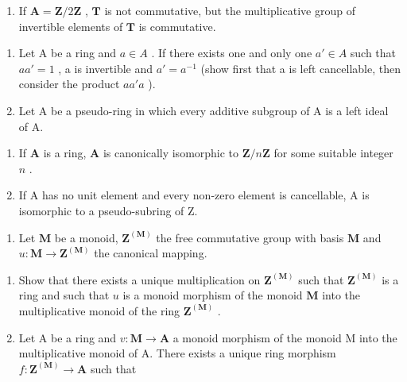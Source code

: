 \begin{enumerate}
\def\labelenumi{(\alph{enumi})}
\setcounter{enumi}{3}
\tightlist
\item
  If \(\mathbf{A} = \mathbf{Z} / 2\mathbf{Z}\) , \(\mathbf{T}\) is not commutative, but the multiplicative group of invertible elements of \(\mathbf{T}\) is commutative.
\end{enumerate}

\begin{enumerate}
\def\labelenumi{\arabic{enumi}.}
\setcounter{enumi}{2}
\item
  Let A be a ring and \(a \in A\) . If there exists one and only one \(a' \in A\) such that \(aa' = 1\) , a is invertible and \(a' = a^{-1}\) (show first that a is left cancellable, then consider the product \(aa'a\) ).
\item
  Let A be a pseudo-ring in which every additive subgroup of A is a left ideal of A.
\end{enumerate}

\begin{enumerate}
\def\labelenumi{(\alph{enumi})}
\item
  If \(\mathbf{A}\) is a ring, \(\mathbf{A}\) is canonically isomorphic to \(\mathbf{Z} / n\mathbf{Z}\) for some suitable integer \(n\) .
\item
  If A has no unit element and every non-zero element is cancellable, A is isomorphic to a pseudo-subring of Z.
\end{enumerate}

\begin{enumerate}
\def\labelenumi{\arabic{enumi}.}
\setcounter{enumi}{4}
\tightlist
\item
  Let \(\mathbf{M}\) be a monoid, \(\mathbf{Z}^{(\mathbf{M})}\) the free commutative group with basis \(\mathbf{M}\) and \(u\colon \mathbf{M}\to \mathbf{Z}^{(\mathbf{M})}\) the canonical mapping.
\end{enumerate}

\begin{enumerate}
\def\labelenumi{(\alph{enumi})}
\item
  Show that there exists a unique multiplication on \(\mathbf{Z}^{(\mathbf{M})}\) such that \(\mathbf{Z}^{(\mathbf{M})}\) is a ring and such that \(u\) is a monoid morphism of the monoid \(\mathbf{M}\) into the multiplicative monoid of the ring \(\mathbf{Z}^{(\mathbf{M})}\) .
\item
  Let A be a ring and \(v: \mathbf{M} \to \mathbf{A}\) a monoid morphism of the monoid M into the multiplicative monoid of A. There exists a unique ring morphism \(f: \mathbf{Z}^{(\mathbf{M})} \to \mathbf{A}\) such that
\end{enumerate}

